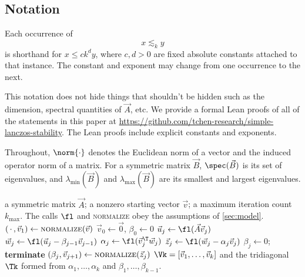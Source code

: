 \subsection{Notation}

\begin{definition}
Each occurrence of 
\[
 x\lesssim_k y
\]
is shorthand for \(x\le c k^dy\), where \(c,d>0\) are fixed absolute constants attached to that instance.
The constant and exponent may change from one occurrence to the next.
\end{definition}

\begin{remark}
This notation does not hide things that shouldn't be hidden such as the dimension, spectral quantities of $\vec{A}$, etc.
We provide a formal Lean proofs of all of the statements in this paper at \url{https://github.com/tchen-research/simple-lanczos-stability}. The Lean proofs include explicit constants and exponents.
\end{remark}

Throughout, \(\norm{\cdot}\) denotes the Euclidean norm of a vector and the induced operator norm of a matrix.
For a symmetric matrix \(\vec B\), \(\spec(\vec B)\) is its set of eigenvalues, and \(\lambda_{\min}(\vec B)\) and \(\lambda_{\max}(\vec B)\) are its smallest and largest eigenvalues.

\begin{algorithm}[htb]
\caption{Finite-precision symmetric Lanczos without reorthogonalization}
\label{alg:lanczos}
\small
\begin{algorithmic}[1]
\Require a symmetric matrix \(\vec A\); a nonzero starting vector
  \(\vec v\); a maximum iteration count
  \(k_{\max}\).  The calls \(\fl\) and \textsc{normalize} obey the
  assumptions of \cref{sec:model}.
\State \((\,\cdot\,,\vec v_1)\gets\textsc{normalize}(\vec v)\)
\State \(\vec v_0\gets\vec0\), \(\beta_0\gets0\)
  \State \(\vec u_j\gets\fl(\vec A\vec v_j)\)
  \State \(\vec w_j\gets\fl(\vec u_j-\beta_{j-1}\vec v_{j-1})\)
  \State \(\alpha_j\gets\fl(\vec v_j^\T\vec w_j)\)
  \State \(\vec z_j\gets\fl(\vec w_j-\alpha_j\vec v_j)\)
    \State \(\beta_j\gets0\); \textbf{terminate}
  \Else
    \State \((\beta_j,\vec v_{j+1})\gets\textsc{normalize}(\vec z_j)\)
  \EndIf
\EndFor
\Ensure 
  \(\Vk=[\vec v_1,\ldots,\vec v_k]\) and the tridiagonal \(\Tk\)
  formed from \(\alpha_1,\ldots,\alpha_k\) and
  \(\beta_1,\ldots,\beta_{k-1}\).
\end{algorithmic}
\end{algorithm}

